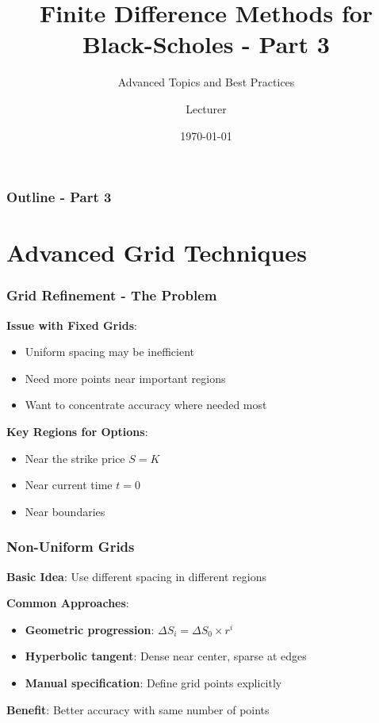 \documentclass[aspectratio=169]{beamer}
\title{Finite Difference Methods for Black-Scholes - Part 3}
\subtitle{Advanced Topics and Best Practices}
\author{Lecturer}
\date{\today}
\begin{document}
\begin{frame}
\titlepage
\end{frame}

\begin{frame}
\frametitle{Outline - Part 3}
\tableofcontents
\end{frame}

\section{Advanced Grid Techniques}

\begin{frame}
\frametitle{Grid Refinement - The Problem}
\textbf{Issue with Fixed Grids}:
\begin{itemize}
\item Uniform spacing may be inefficient
\item Need more points near important regions
\item Want to concentrate accuracy where needed most
\end{itemize}

\textbf{Key Regions for Options}:
\begin{itemize}
\item Near the strike price \(S = K\)
\item Near current time \(t = 0\)
\item Near boundaries
\end{itemize}
\end{frame}

\begin{frame}
\frametitle{Non-Uniform Grids}
\textbf{Basic Idea}: Use different spacing in different regions

\textbf{Common Approaches}:
\begin{itemize}
\item \textbf{Geometric progression}: \(\Delta S_i = \Delta S_0 \times r^i\)
\item \textbf{Hyperbolic tangent}: Dense near center, sparse at edges
\item \textbf{Manual specification}: Define grid points explicitly
\end{itemize}

\textbf{Benefit}: Better accuracy with same number of points
\end{frame}
\end{document}
